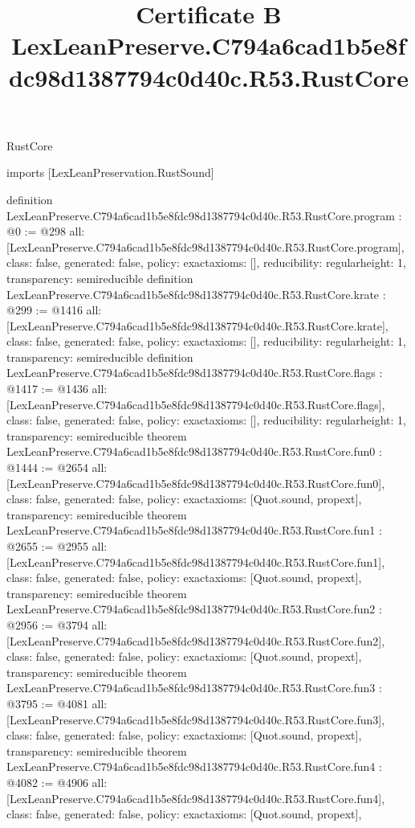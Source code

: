 \begin{lexlean}{RustCore}
\title{Certificate B LexLeanPreserve.C794a6cad1b5e8fdc98d1387794c0d40c.R53.RustCore}
\begin{coremodule}
imports [LexLeanPreservation.RustSound]

definition LexLeanPreserve.C794a6cad1b5e8fdc98d1387794c0d40c.R53.RustCore.program : @0 := @298 {
  all: [LexLeanPreserve.C794a6cad1b5e8fdc98d1387794c0d40c.R53.RustCore.program],
  class: false,
  generated: false,
  policy: exact{axioms: []},
  reducibility: regular{height: 1},
  transparency: semireducible
}
definition LexLeanPreserve.C794a6cad1b5e8fdc98d1387794c0d40c.R53.RustCore.krate : @299 := @1416 {
  all: [LexLeanPreserve.C794a6cad1b5e8fdc98d1387794c0d40c.R53.RustCore.krate],
  class: false,
  generated: false,
  policy: exact{axioms: []},
  reducibility: regular{height: 1},
  transparency: semireducible
}
definition LexLeanPreserve.C794a6cad1b5e8fdc98d1387794c0d40c.R53.RustCore.flags : @1417 := @1436 {
  all: [LexLeanPreserve.C794a6cad1b5e8fdc98d1387794c0d40c.R53.RustCore.flags],
  class: false,
  generated: false,
  policy: exact{axioms: []},
  reducibility: regular{height: 1},
  transparency: semireducible
}
theorem LexLeanPreserve.C794a6cad1b5e8fdc98d1387794c0d40c.R53.RustCore.fun0 : @1444 := @2654 {
  all: [LexLeanPreserve.C794a6cad1b5e8fdc98d1387794c0d40c.R53.RustCore.fun0],
  class: false,
  generated: false,
  policy: exact{axioms: [Quot.sound, propext]},
  transparency: semireducible
}
theorem LexLeanPreserve.C794a6cad1b5e8fdc98d1387794c0d40c.R53.RustCore.fun1 : @2655 := @2955 {
  all: [LexLeanPreserve.C794a6cad1b5e8fdc98d1387794c0d40c.R53.RustCore.fun1],
  class: false,
  generated: false,
  policy: exact{axioms: [Quot.sound, propext]},
  transparency: semireducible
}
theorem LexLeanPreserve.C794a6cad1b5e8fdc98d1387794c0d40c.R53.RustCore.fun2 : @2956 := @3794 {
  all: [LexLeanPreserve.C794a6cad1b5e8fdc98d1387794c0d40c.R53.RustCore.fun2],
  class: false,
  generated: false,
  policy: exact{axioms: [Quot.sound, propext]},
  transparency: semireducible
}
theorem LexLeanPreserve.C794a6cad1b5e8fdc98d1387794c0d40c.R53.RustCore.fun3 : @3795 := @4081 {
  all: [LexLeanPreserve.C794a6cad1b5e8fdc98d1387794c0d40c.R53.RustCore.fun3],
  class: false,
  generated: false,
  policy: exact{axioms: [Quot.sound, propext]},
  transparency: semireducible
}
theorem LexLeanPreserve.C794a6cad1b5e8fdc98d1387794c0d40c.R53.RustCore.fun4 : @4082 := @4906 {
  all: [LexLeanPreserve.C794a6cad1b5e8fdc98d1387794c0d40c.R53.RustCore.fun4],
  class: false,
  generated: false,
  policy: exact{axioms: [Quot.sound, propext]},
}
\end{coremodule}
\end{lexlean}
